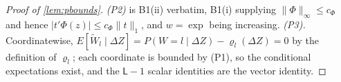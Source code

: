 \begin{proof}[Proof of \cref{lem:pbounds}]
\emph{\textup{(P2)}} is B1(ii) verbatim, B1(i) supplying $\|\Phi\|_\infty\le c_\Phi$ and hence
$|t'\Phi(z)|\le c_\Phi\|t\|_{1}$, and $w=\exp$ being increasing.
\emph{\textup{(P3)}.} Coordinatewise,
$E[\widetilde W_l\mid\Delta Z]=P(W=l\mid\Delta Z)-\varrho_l(\Delta Z)=0$ by the definition of
$\varrho_l$; each coordinate is bounded by \textup{(P1)}, so the conditional expectations exist, and the
$\mathsf L-1$ scalar identities are the vector identity.
\end{proof}

